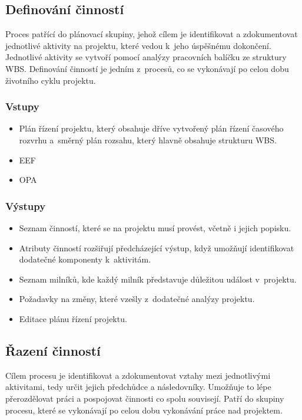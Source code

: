 \subsection*{Definování činností}

Proces patřící do plánovací skupiny, jehož cílem je identifikovat a zdokumentovat jednotlivé aktivity na projektu, které vedou k~jeho úspěšnému dokončení. Jednotlivé aktivity se vytvoří pomocí analýzy pracovních balíčku ze struktury WBS. Definování činností je jedním z~procesů, co se vykonávají po celou dobu životního cyklu projektu.

\subsubsection*{Vstupy}
\begin{itemize}
    \item Plán řízení projektu, který obsahuje dříve vytvořený plán řízení časového rozvrhu a~směrný plán rozsahu, který hlavně obsahuje strukturu WBS.
    \item EEF
    \item OPA
\end{itemize}
\subsubsection*{Výstupy}
\begin{itemize}
    \item Seznam činností, které se na projektu musí provést, včetně i jejich popisku. 
    \item Atributy činností rozšiřují předcházející výstup, když umožňují identifikovat dodatečné komponenty k~aktivitám.
    \item Seznam milníků, kde každý milník představuje důležitou událost v~projektu.
    \item Požadavky na změny, které vzešly z~dodatečné analýzy projektu.
    \item Editace plánu řízení projektu.
\end{itemize}


\subsection*{Řazení činností}

Cílem procesu je identifikovat a zdokumentovat vztahy mezi jednotlivými aktivitami, tedy určit jejich předchůdce a následovníky. Umožňuje to lépe přerozdělovat práci a pospojovat činnosti co spolu souvisejí. Patří do skupiny procesu, které se vykonávají po celou dobu vykonávání práce nad projektem.

